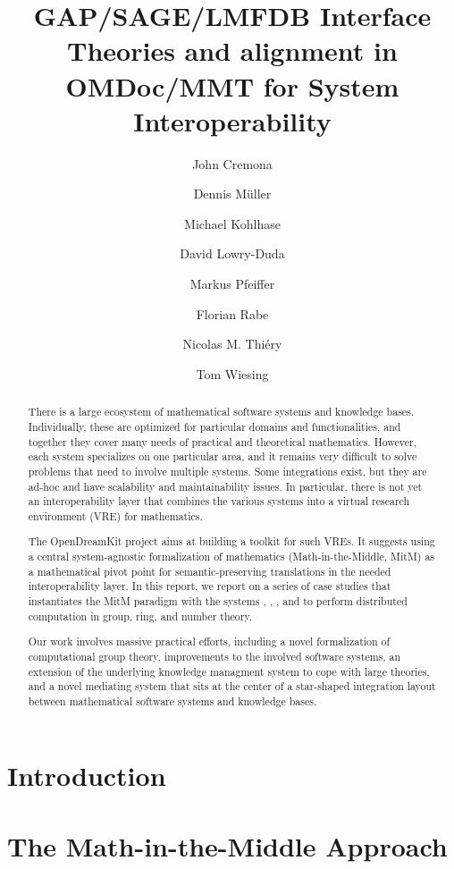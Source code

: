 \documentclass[book]{deliverablereport}
\title{GAP/SAGE/LMFDB Interface Theories and alignment in OMDoc/MMT for System Interoperability}
\author{John Cremona}
\author{Dennis M\"uller}
\author{Michael Kohlhase}
\author{David Lowry-Duda}
\author{Markus Pfeiffer}
\author{Florian Rabe}
\author{Nicolas M. Thiéry}
\author{Tom Wiesing}
\def\papertype{report\xspace}
\begin{document}
\begin{abstract}
  There is a large ecosystem of mathematical software systems and knowledge bases.
  Individually, these are optimized for particular domains and functionalities, and
  together they cover many needs of practical and theoretical mathematics.  However, each
  system specializes on one particular area, and it remains very difficult to solve
  problems that need to involve multiple systems.  Some integrations exist, but they are
  ad-hoc and have scalability and maintainability issues.  In particular, there is not yet
  an interoperability layer that combines the various systems into a virtual research
  environment (VRE) for mathematics.
  
  The OpenDreamKit project aims at building a toolkit for such VREs.  It suggests using a
  central system-agnostic formalization of mathematics (Math-in-the-Middle, MitM) as a
  mathematical pivot point for semantic-preserving translations in the needed
  interoperability layer.  In this \papertype, we report on a series of case studies that
  instantiates the MitM paradigm with the systems \GAP, \Sage, \LMFDB, and
  \Singular to perform distributed computation in group,
  ring, and number theory.
 
  Our work involves massive practical efforts, including a novel formalization of
  computational group theory, improvements to the involved software systems, an extension
  of the underlying knowledge managment system to cope with large theories, and a novel
  mediating system that sits at the center of a star-shaped integration layout between
  mathematical software systems and knowledge bases.
\end{abstract}

\maketitle
\setcounter{tocdepth}{2}
\newpage\tableofcontents\newpage

\section{Introduction}\label{sec:intro}
\newpage

\section[Math-in-the-Middle]{The Math-in-the-Middle Approach}\label{sec:mitm}
\newpage
\end{document}
